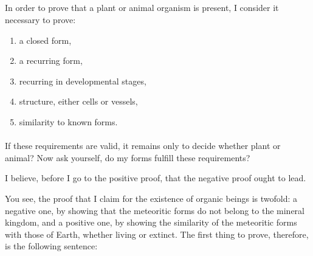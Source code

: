 \documentclass[a4paper, 12pt, oneside]{article}
\begin{document}
\subsection{}
\subsubsection{}
\paragraph*{}
In order to prove that a plant or animal organism is present, I consider it necessary to prove:
\begin{enumerate}
    \item a closed form,
    \item a recurring form,
    \item recurring in developmental stages,
    \item structure, either cells or vessels,
    \item similarity to known forms.
\end{enumerate}
\paragraph*{}
If these requirements are valid, it remains only to decide whether plant or animal? Now ask yourself, do my forms fulfill these requirements?

I believe, before I go to the positive proof, that the negative proof ought to lead.

You see, the proof that I claim for the existence of organic beings is twofold: a negative one, by showing that the meteoritic forms do not belong to the mineral kingdom, and a positive one, by showing the similarity of the meteoritic forms with those of Earth, whether living or extinct. The first thing to prove, therefore, is the following sentence:
\end{document}
